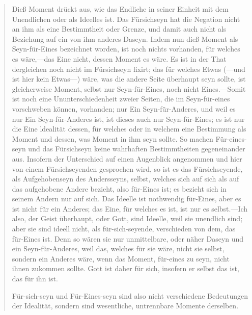 \documentclass{article}
\begin{document}
\begin{quote}
    Dieß Moment drückt aus, wie das Endliche in seiner Einheit mit dem Unendlichen oder als Ideelles ist.
Das Fürsichseyn hat die Negation nicht an ihm als eine Bestimmtheit oder Grenze, und damit auch nicht
als Beziehung auf ein von ihm anderes Daseyn. Indem nun dieß Moment als Seyn-für-Eines bezeichnet worden,
ist noch nichts vorhanden, für welches es wäre,—das Eine nicht, dessen Moment es wäre. Es ist in der That
dergleichen noch nicht im Fürsichseyn fixirt; das für welches Etwas (—und ist hier kein Etwas—) wäre,
was die andere Seite überhaupt seyn sollte, ist gleicherweise Moment, selbst nur Seyn-für-Eines, noch
nicht Eines.—Somit ist noch eine Ununterschiedenheit zweier Seiten, die im Seyn-für-eines vorschweben
können, vorhanden; nur Ein Seyn-für-Anderes, und weil es nur Ein Seyn-für-Anderes ist, ist dieses auch
nur Seyn-für-Eines; es ist nur die Eine ldealität dessen, für welches oder in welchem eine Bestimmung
als Moment und dessen, was Moment in ihm seyn sollte. So machen Für-eines-seyn und das Fürsichseyn keine
wahrhaften Bestimmtheiten gegeneinander aus. Insofern der Unterschied auf einen Augenblick angenommen
und hier von einem Fürsichseyenden gesprochen wird, so ist es das Fürsichseyende, als Aufgehobenseyn des
Andersseyns, selbst, welches sich auf sich als auf das aufgehobene Andere bezieht, also für-Eines ist;
es bezieht sich in seinem Andern nur auf sich. Das Ideelle ist nothwendig für-Eines, aber es ist nicht
für ein Anderes; das Eine, für welches es ist, ist nur es selbst.—Ich also, der Geist überhaupt, oder
Gott, sind Ideelle, weil sie unendlich sind; aber sie sind ideell nicht, als für-sich-seyende, verschieden
von dem, das für-Eines ist. Denn so wären sie nur unmittelbare, oder näher Daseyn und ein Seyn-für-Anderes,
weil das, welches für sie wäre, nicht sie selbst, sondern ein Anderes wäre, wenn das Moment, für-eines
zu seyn, nicht ihnen zukommen sollte. Gott ist daher für sich, insofern er selbst das ist, das für ihn
ist.

    Für-sich-seyn und Für-Eines-seyn sind also nicht verschiedene
    Bedeutungen der Idealität, sondern sind wesentliche, untrennbare
    Momente derselben.
\end{quote}
\end{document}
